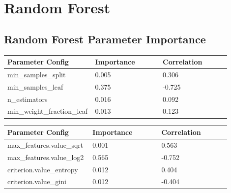 \documentclass[11pt]{article}
\begin{document}
\FloatBarrier
\newpage
\section{Random Forest}

\subsection{Random Forest Parameter Importance}
  \begin{table}[ht]
    \centering
    \begin{tabular}{|p{0.3\linewidth} | p{0.3\linewidth}| p{0.3\linewidth}|} 
      \hline
      \textbf{Parameter Config}  & \textbf{Importance} & \textbf{Correlation} \\ \hline
        min\_samples\_split & 0.005 & 0.306 \\ \hline
        min\_samples\_leaf & 0.375 & -0.725 \\ \hline
        n\_estimators & 0.016 & 0.092 \\ \hline
        min\_weight\_fraction\_leaf & 0.013 & 0.123 \\ \hline
    \end{tabular}
  \end{table}\label{RF_ParamImp1}

  \begin{table}[ht]
    \centering
    \begin{tabular}{|p{0.3\linewidth} | p{0.3\linewidth}| p{0.3\linewidth}|} 
      \hline
      \textbf{Parameter Config}  & \textbf{Importance} & \textbf{Correlation} \\ \hline
      max\_features.value\_sqrt & 0.001 & 0.563 \\ \hline
      max\_features.value\_log2 & 0.565 & -0.752 \\ \hline
      criterion.value\_entropy & 0.012 & 0.404 \\ \hline
      criterion.value\_gini & 0.012 & -0.404 \\ \hline
    \end{tabular}
  \end{table}\label{RF_ParamImp2}
\end{document}
